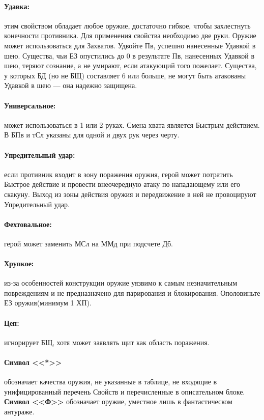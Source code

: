 \paragraph{Удавка:} этим свойством обладает любое оружие, достаточно гибкое, чтобы захлестнуть конечности противника. Для применения свойства необходимо две руки. Оружие может использоваться для Захватов. Удвойте Пв, успешно нанесенные Удавкой в шею. Существа, чьи ЕЗ опустились до 0 в результате Пв, нанесенных Удавкой в шею, теряют сознание, а не умирают, если атакующий того пожелает. Существа, у которых БД (но не БЩ) составляет 6 или больше, не могут быть атакованы Удавкой в шею — она надежно защищена.
\paragraph{Универсальное:} может использоваться в 1 или 2 руках. Смена хвата является Быстрым действием. В БПв и тСл указаны для одной и двух рук через черту.
\paragraph{Упредительный удар:} если противник входит в зону поражения оружия, герой может потратить Быстрое действие и провести внеочередную атаку по нападающему или его скакуну. Выход из зоны действия оружия и передвижение в ней не провоцируют Упредительный удар.
\paragraph{Фехтовальное:} герой может заменить МСл на ММд при подсчете Дб.
\paragraph{Хрупкое:} из-за особенностей конструкции оружие уязвимо к самым незначительным повреждениям и не предназначено для парирования и блокирования. Ополовиньте ЕЗ оружия(минимум 1 ХП).
\paragraph{Цеп:} игнорирует БЩ, хотя может заявлять щит как область поражения.
\paragraph{Символ <<*>>} обозначает качества оружия, не указанные в таблице, не входящие в унифицированный перечень Свойств и перечисленные в описательном блоке. \textbf{Символ <<Ф>>} обозначает оружие, уместное лишь в фантастическом антураже.